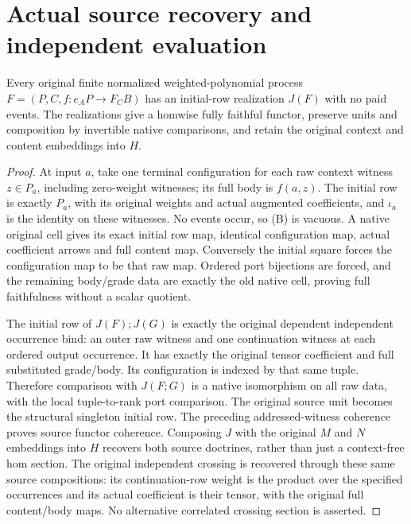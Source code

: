 \documentclass[11pt]{article}
\begin{document}
\section{Actual source recovery and independent evaluation}
\begin{theorem}
Every original finite normalized weighted-polynomial process
$F=(P,C,f:e_AP\to F_CB)$ has an initial-row realization $J(F)$ with no paid events. The realizations give a homwise fully faithful functor, preserve units and composition by invertible native comparisons, and retain the original context and content embeddings into $H$.
\end{theorem}
\begin{proof}
At input $a$, take one terminal configuration for each raw context witness $z\in P_a$, including zero-weight witnesses; its full body is $f(a,z)$. The initial row is exactly $P_a$, with its original weights and actual augmented coefficients, and $\iota_a$ is the identity on these witnesses. No events occur, so (B) is vacuous. A native original cell gives its exact initial row map, identical configuration map, actual coefficient arrows and full content map. Conversely the initial square forces the configuration map to be that raw map. Ordered port bijections are forced, and the remaining body/grade data are exactly the old native cell, proving full faithfulness without a scalar quotient.

The initial row of $J(F);J(G)$ is exactly the original dependent independent occurrence bind: an outer raw witness and one continuation witness at each ordered output occurrence. It has exactly the original tensor coefficient and full substituted grade/body. Its configuration is indexed by that same tuple. Therefore comparison with $J(F;G)$ is a native isomorphism on all raw data, with the local tuple-to-rank port comparison. The original source unit becomes the structural singleton initial row. The preceding addressed-witness coherence proves source functor coherence. Composing $J$ with the original $M$ and $N$ embeddings into $H$ recovers both source doctrines, rather than just a context-free hom section. The original independent crossing is recovered through these same source compositions: its continuation-row weight is the product over the specified occurrences and its actual coefficient is their tensor, with the original full content/body maps. No alternative correlated crossing section is asserted.
\end{proof}
\end{document}
